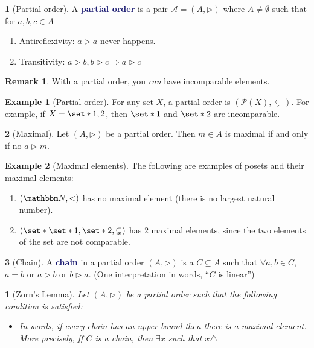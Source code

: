 \documentclass[12pt]{article}
\newcommand{\navy}[1]{\textcolor{MidnightBlue}{\bf #1}}
\theoremstyle{plain}
\newtheorem{theorem}{\color{ForestGreen}{\textbf{Theorem}}}[section]
\theoremstyle{definition}
\newtheorem{definition}{\color{MidnightBlue}{\textbf{Definition}}}[section]
\newtheorem{example}{\color{WildStrawberry}Example}[section]
\newtheorem*{remark}{Remark}
\def\Set{\set*}%
\def\imp{\Rightarrow}
\newcommand{\1}{\mathbbm 1}
\newcommand{\NN}{\mathbbm N}
\newcommand{\pP}{\mathcal P}
\newcommand{\aAA}{\mathcal A}
\newcommand{\zZ}{\mathcal Z}
\begin{document}
\begin{definition}[Partial order]
	A \navy{partial order} is a pair $\aAA = (A, \triangleright)$ where $A \neq \emptyset$ such that  for $a,b,c \in A$
	\begin{enumerate}
		\item Antireflexivity: $a \triangleright a$ never happens.
		\item Transitivity: $a \triangleright b, b \triangleright c \imp a \triangleright c$ 
	\end{enumerate}
\end{definition}
\begin{remark}
	With a partial order, you \emph{can} have incomparable elements. 
\end{remark}

\begin{example}[Partial order]
	For any set $X$, a partial order is $(\pP(X), \subsetneq)$. For example, if $X=\Set{1,2}$, then $\Set{1}$ and $\Set{2}$ are incomparable. 
\end{example}

\begin{definition}[Maximal]
	Let $(A, \triangleright)$ be a partial order. Then $m \in A$ is maximal if and only if no $a \triangleright m$. 
\end{definition}

\begin{example}[Maximal elements]
	The following are examples of posets and their maximal elements: 
	\begin{enumerate}
		\item $(\NN, <)$ has no maximal element (there is no largest natural number).
		\item $(\Set{\Set{1},\Set{2}}, \subsetneq)$ has 2 maximal elements, since the two elements of the set are not comparable. 
	\end{enumerate}
\end{example}

\begin{definition}[Chain]
	A \navy{chain} in a partial order $(A, \triangleright)$ is a $C \subseteq A$ such that $\forall a,b \in C$, $a=b$ or $a \triangleright b$ or $b \triangleright a$. (One interpretation in words, ``$C$ is linear'') 
\end{definition}

\begin{theorem}[Zorn's Lemma]
	Let $(A, \triangleright)$ be a partial order such that the following condition is satisfied:
	\begin{itemize}
		\item[($\zZ$)] In words, if every chain has an upper bound then there is a maximal element. More precisely, ff $C$ is a chain, then $\exists x$ such that $x \triangle$
	\end{itemize}
\end{theorem}
\end{document}
